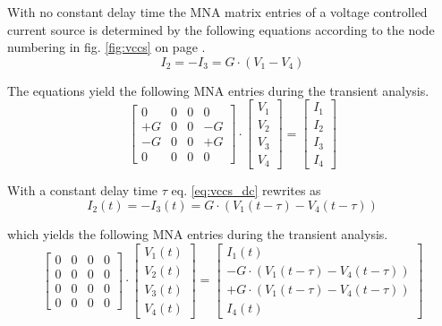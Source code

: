 With no constant delay time the MNA matrix entries of a voltage
controlled current source is determined by the following equations
according to the node numbering in fig. \ref{fig:vccs} on page
\pageref{fig:vccs}.
\begin{equation}
\label{eq:vccs_dc}
I_2 = -I_3 = G\cdot \left(V_1 - V_4\right)
\end{equation}

The equations yield the following MNA entries during the transient
analysis.
\begin{equation}
\begin{bmatrix}
0 & 0 & 0 & 0\\
+G & 0 & 0 & -G\\
-G & 0 & 0 & +G\\
0 & 0 & 0 & 0
\end{bmatrix}
\cdot
\begin{bmatrix}
V_1\\
V_2\\
V_3\\
V_4
\end{bmatrix}
=
\begin{bmatrix}
I_1\\
I_2\\
I_3\\
I_4
\end{bmatrix}
\end{equation}

With a constant delay time $\tau$ eq. \eqref{eq:vccs_dc} rewrites as
\begin{equation}
\label{eq:vccs_delay}
I_2\left(t\right) = -I_3\left(t\right) = G\cdot \left(V_1\left(t -\tau\right) - V_4\left(t -\tau\right)\right)
\end{equation}

which yields the following MNA entries during the transient analysis.
\begin{equation}
\begin{bmatrix}
0 & 0 & 0 & 0\\
0 & 0 & 0 & 0\\
0 & 0 & 0 & 0\\
0 & 0 & 0 & 0
\end{bmatrix}
\cdot
\begin{bmatrix}
V_1\left(t\right)\\
V_2\left(t\right)\\
V_3\left(t\right)\\
V_4\left(t\right)
\end{bmatrix}
=
\begin{bmatrix}
I_1\left(t\right)\\
-G\cdot\left(V_1\left(t -\tau\right) - V_4\left(t -\tau\right)\right)\\
+G\cdot\left(V_1\left(t -\tau\right) - V_4\left(t -\tau\right)\right)\\
I_4\left(t\right)
\end{bmatrix}
\end{equation}

